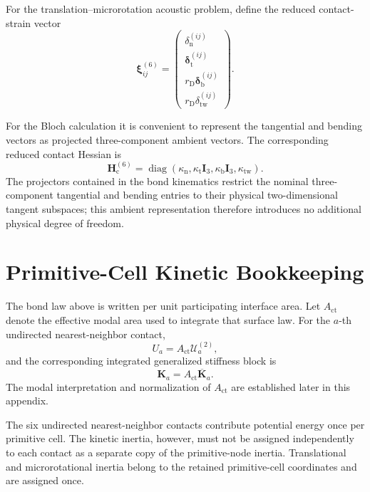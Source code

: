 For the translation--microrotation acoustic problem, define the reduced contact-strain vector
\begin{equation}
    \boldsymbol{\xi}_{ij}^{(6)} =
    \begin{pmatrix}
        \delta_{\mathrm{n}}^{(ij)} \\
        \boldsymbol{\delta}_{\mathrm{t}}^{(ij)} \\
        r_{\mathrm{D}}\boldsymbol{\delta}_{\mathrm{b}}^{(ij)} \\
        r_{\mathrm{D}}\delta_{\mathrm{tw}}^{(ij)}
    \end{pmatrix}.
\end{equation}

For the Bloch calculation it is convenient to represent the tangential and bending vectors as projected three-component ambient vectors. The corresponding reduced contact Hessian is
\begin{equation}
    \mathbf{H}_{\mathrm{c}}^{(6)}
    =
    \operatorname{diag}
    \left(
        \kappa_{\mathrm{n}},
        \kappa_{\mathrm{t}}\mathbf{I}_3,
        \kappa_{\mathrm{b}}\mathbf{I}_3,
        \kappa_{\mathrm{tw}}
    \right).
\end{equation}
The projectors contained in the bond kinematics restrict the nominal three-component tangential and bending entries to their physical two-dimensional tangent subspaces; this ambient representation therefore introduces no additional physical degree of freedom.


\section[Primitive-Cell Inertia]{Primitive-Cell Kinetic Bookkeeping}
\label{sec:fcc_cell_inertia}

The bond law above is written per unit participating interface area. Let $A_{\mathrm{ct}}$ denote the effective modal area used to integrate that surface law. For the $a$-th undirected nearest-neighbor contact,
\begin{equation}
    U_a = A_{\mathrm{ct}}\mathcal{U}_a^{(2)},
\end{equation}
and the corresponding integrated generalized stiffness block is
\begin{equation}
    \mathbf{K}_a = A_{\mathrm{ct}}\overline{\mathbf{K}}_a.
\end{equation}
The modal interpretation and normalization of $A_{\mathrm{ct}}$ are established later in this appendix.

The six undirected nearest-neighbor contacts contribute potential energy once per primitive cell. The kinetic inertia, however, must not be assigned independently to each contact as a separate copy of the primitive-node inertia. Translational and microrotational inertia belong to the retained primitive-cell coordinates and are assigned once.

